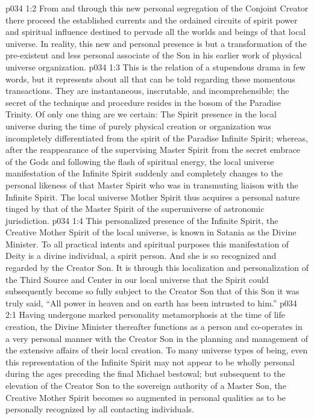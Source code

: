 \vs p034 1:2 From and through this new personal segregation of the Conjoint Creator there proceed the established currents and the ordained circuits of spirit power and spiritual influence destined to pervade all the worlds and beings of that local universe. In reality, this new and personal presence is but a transformation of the pre\hyp{}existent and less personal associate of the Son in his earlier work of physical universe organization.
\pc \vs p034 1:3 This is the relation of a stupendous drama in few words, but it represents about all that can be told regarding these momentous transactions. They are instantaneous, inscrutable, and incomprehensible; the secret of the technique and procedure resides in the bosom of the Paradise Trinity. Of only one thing are we certain: The Spirit presence in the local universe during the time of purely physical creation or organization was incompletely differentiated from the spirit of the Paradise Infinite Spirit; whereas, after the reappearance of the supervising Master Spirit from the secret embrace of the Gods and following the flash of spiritual energy, the local universe manifestation of the Infinite Spirit suddenly and completely changes to the personal likeness of that Master Spirit who was in transmuting liaison with the Infinite Spirit. The local universe Mother Spirit thus acquires a personal nature tinged by that of the Master Spirit of the superuniverse of astronomic jurisdiction.
\vs p034 1:4 This personalized presence of the Infinite Spirit, the Creative Mother Spirit of the local universe, is known in Satania as the Divine Minister. To all practical intents and spiritual purposes this manifestation of Deity is a divine individual, a spirit person. And she is so recognized and regarded by the Creator Son. It is through this localization and personalization of the Third Source and Center in our local universe that the Spirit could subsequently become so fully subject to the Creator Son that of this Son it was truly said, “All power in heaven and on earth has been intrusted to him.”
\vs p034 2:1 Having undergone marked personality metamorphosis at the time of life creation, the Divine Minister thereafter functions as a person and co\hyp{}operates in a very personal manner with the Creator Son in the planning and management of the extensive affairs of their local creation. To many universe types of being, even this representation of the Infinite Spirit may not appear to be wholly personal during the ages preceding the final Michael bestowal; but subsequent to the elevation of the Creator Son to the sovereign authority of a Master Son, the Creative Mother Spirit becomes so augmented in personal qualities as to be personally recognized by all contacting individuals.
